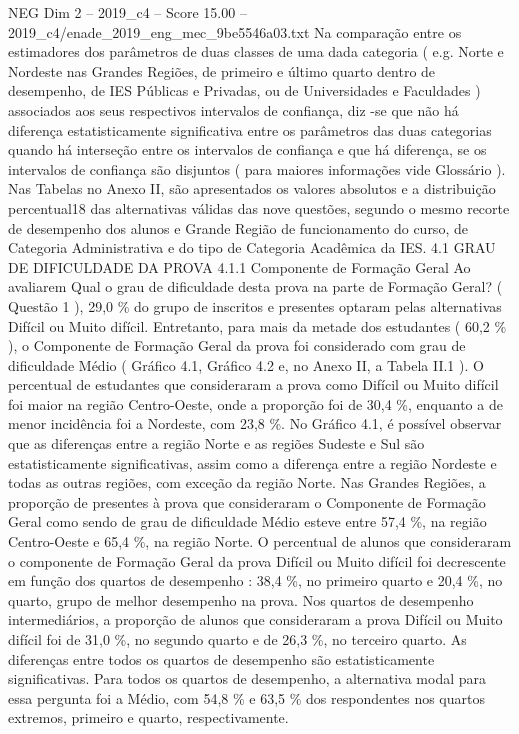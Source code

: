 \begin{textsample}{NEG Dim 2 – 2019\_c4 – Score 15.00 – 2019\_c4/enade\_2019\_eng\_mec\_9be5546a03.txt}
Na comparação entre os estimadores dos parâmetros de duas classes de uma dada categoria ( e.g.
Norte e Nordeste nas Grandes Regiões, de primeiro e último quarto dentro de desempenho, de IES Públicas e Privadas, ou de Universidades e Faculdades ) associados aos seus respectivos intervalos de confiança, diz -se que não há diferença estatisticamente significativa entre os parâmetros das duas categorias quando há interseção entre os intervalos de confiança e que há diferença, se os intervalos de confiança são disjuntos ( para maiores informações vide Glossário ).
Nas Tabelas no Anexo II, são apresentados os valores absolutos e a distribuição percentual18 das alternativas válidas das nove questões, segundo o mesmo recorte de desempenho dos alunos e Grande Região de funcionamento do curso, de Categoria Administrativa e do tipo de Categoria Acadêmica da IES. 4.1 GRAU DE DIFICULDADE DA PROVA 4.1.1 Componente de Formação Geral Ao avaliarem Qual o grau de dificuldade desta prova na parte de Formação Geral? ( Questão 1 ), 29,0 \% do grupo de inscritos e presentes optaram pelas alternativas Difícil ou Muito difícil.
Entretanto, para mais da metade dos estudantes ( 60,2 \% ), o Componente de Formação Geral da prova foi considerado com grau de dificuldade Médio ( Gráfico 4.1, Gráfico 4.2 e, no Anexo II, a Tabela II.1 ).
O percentual de estudantes que consideraram a prova como Difícil ou Muito difícil foi maior na região Centro-Oeste, onde a proporção foi de 30,4 \%, enquanto a de menor incidência foi a Nordeste, com 23,8 \%.
No Gráfico 4.1, é possível observar que as diferenças entre a região Norte e as regiões Sudeste e Sul são estatisticamente significativas, assim como a diferença entre a região Nordeste e todas as outras regiões, com exceção da região Norte.
Nas Grandes Regiões, a proporção de presentes à prova que consideraram o Componente de Formação Geral como sendo de grau de dificuldade Médio esteve entre 57,4 \%, na região Centro-Oeste e 65,4 \%, na região Norte.
O percentual de alunos que consideraram o componente de Formação Geral da prova Difícil ou Muito difícil foi decrescente em função dos quartos de desempenho : 38,4 \%, no primeiro quarto e 20,4 \%, no quarto, grupo de melhor desempenho na prova.
Nos quartos de desempenho intermediários, a proporção de alunos que consideraram a prova Difícil ou Muito difícil foi de 31,0 \%, no segundo quarto e de 26,3 \%, no terceiro quarto.
As diferenças entre todos os quartos de desempenho são estatisticamente significativas.
Para todos os quartos de desempenho, a alternativa modal para essa pergunta foi a Médio, com 54,8 \% e 63,5 \% dos respondentes nos quartos extremos, primeiro e quarto, respectivamente.

\end{textsample}

